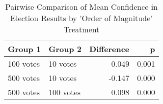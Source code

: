 \begin{table}

\caption{\label{tab:tab:ordermag}Pairwise Comparison of Mean Confidence in Election Results by 'Order of Magnitude' Treatment}
\centering
\begin{tabular}[t]{llrr}
\toprule
Group 1 & Group 2 & Difference & p\\
\midrule
100 votes & 10 votes & -0.049 & 0.001\\
500 votes & 10 votes & -0.147 & 0.000\\
500 votes & 100 votes & 0.098 & 0.000\\
\bottomrule
\end{tabular}
\end{table}
